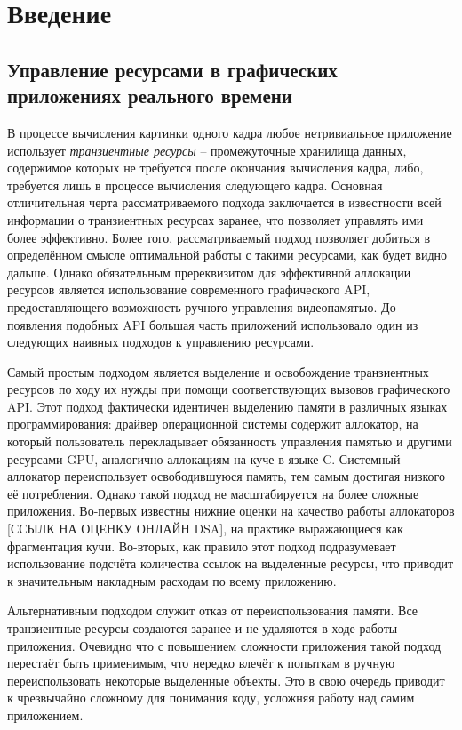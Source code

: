 \section{Введение}

\subsection{Управление ресурсами в графических приложениях реального времени}
В процессе вычисления картинки одного кадра любое нетривиальное приложение использует \textit{транзиентные ресурсы} -- промежуточные хранилища данных, содержимое которых не требуется после окончания вычисления кадра, либо, требуется лишь в процессе вычисления следующего кадра. Основная отличительная черта рассматриваемого подхода заключается в известности всей информации о транзиентных ресурсах заранее, что позволяет управлять ими более эффективно. Более того, рассматриваемый подход позволяет добиться в определённом смысле оптимальной работы с такими ресурсами, как будет видно дальше. Однако обязательным пререквизитом для эффективной аллокации ресурсов является использование современного графического API, предоставляющего возможность ручного управления видеопамятью. До появления подобных API большая часть приложений использовало один из следующих наивных подходов к управлению ресурсами.

Самый простым подходом является выделение и освобождение транзиентных ресурсов по ходу их нужды при помощи соответствующих вызовов графического API. Этот подход фактически идентичен выделению памяти в различных языках программирования: драйвер операционной системы содержит аллокатор, на который пользователь перекладывает обязанность управления памятью и другими ресурсами GPU, аналогично аллокациям на куче в языке C. Системный аллокатор переиспользует освободившуюся память, тем самым достигая низкого её потребления. Однако такой подход не масштабируется на более сложные приложения. Во-первых известны нижние оценки на качество работы аллокаторов [ССЫЛК НА ОЦЕНКУ ОНЛАЙН DSA], на практике выражающиеся как фрагментация кучи. Во-вторых, как правило этот подход подразумевает использование подсчёта количества ссылок на выделенные ресурсы, что приводит к значительным накладным расходам по всему приложению.

Альтернативным подходом служит отказ от переиспользования памяти. Все транзиентные ресурсы создаются заранее и не удаляются в ходе работы приложения. Очевидно что с повышением сложности приложения такой подход перестаёт быть применимым, что нередко влечёт к попыткам в ручную переиспользовать некоторые выделенные объекты. Это в свою очередь приводит к чрезвычайно сложному для понимания коду, усложняя работу над самим приложением.

